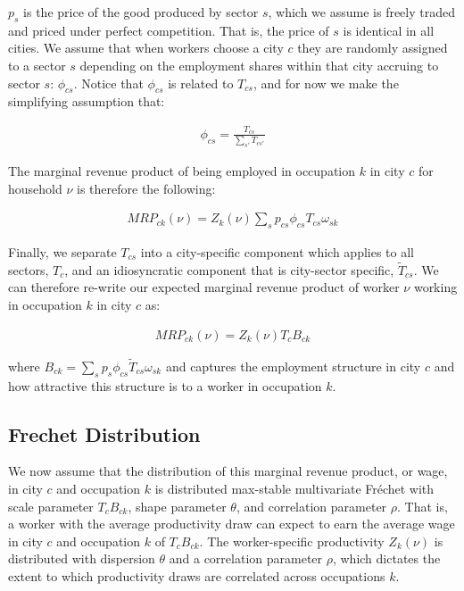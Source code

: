 \documentclass[10pt]{article}
\begin{document}
$p_{s}$ is the price of the good produced by sector $s$, which we assume is freely traded and priced under perfect competition. That is, the price of $s$ is identical in all cities. We assume that when workers choose a city $c$ they are randomly assigned to a sector $s$ depending on the employment shares within that city accruing to sector $s$: $\phi_{cs}$. Notice that $\phi_{cs}$ is related to $T_{cs}$, and for now we make the simplifying assumption that:

\begin{align}
    \phi_{cs} = \frac{T_{cs}}{\sum_{s'}^{} T_{cs'}}
\end{align}

The marginal revenue product of being employed in occupation $k$ in city $c$ for household $\nu$ is therefore the following:

\begin{align}
    {MRP}_{ck}(\nu) = {Z_{k}(\nu)}\sum_{s}^{} p_{cs} \phi_{cs} T_{cs} \omega_{sk}
\end{align}

Finally, we separate $T_{cs}$ into a city-specific component which applies to all sectors, $T_{c}$, and an idiosyncratic component that is city-sector specific, $\tilde{T}_{cs}$. We can therefore re-write our expected marginal revenue product of worker $\nu$ working in occupation $k$ in city $c$ as:

\begin{align}
    {MRP}_{ck}(\nu) = {Z_{k}(\nu)}{T_{c}}{B_{ck}}
\end{align}

where $B_{ck} = \sum_{s}^{} p_{s} \phi_{cs} \tilde{T}_{cs} \omega_{sk}$ and captures the employment structure in city $c$ and how attractive this structure is to a worker in occupation $k$.

\subsection{Frechet Distribution}

We now assume that the distribution of this marginal revenue product, or wage, in city $c$ and occupation $k$ is distributed max-stable multivariate Fréchet with scale parameter $T_{c}B_{ck}$, shape parameter $\theta$, and correlation parameter $\rho$. That is, a worker with the average productivity draw can expect to earn the average wage in city $c$ and occupation $k$ of $T_{c}B_{ck}$. The worker-specific productivity $Z_{k}(\nu)$ is distributed with dispersion $\theta$ and a correlation parameter $\rho$, which dictates the extent to which productivity draws are correlated across occupations $k$.
\end{document}
